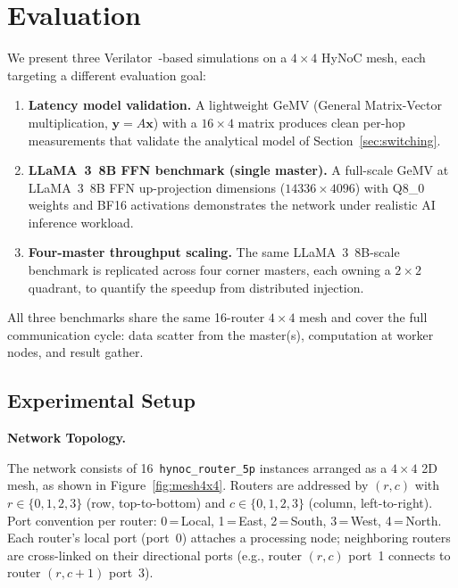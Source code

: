 \section{Evaluation}
\label{sec:evaluation}

We present three Verilator~\cite{verilator}-based simulations on a $4\times4$
HyNoC mesh, each targeting a different evaluation goal:
\begin{enumerate}
  \item \textbf{Latency model validation.}  A lightweight GeMV
        (General Matrix-Vector multiplication, $\mathbf{y}=A\mathbf{x}$) with a
        $16\times4$ matrix produces clean per-hop measurements that validate
        the analytical model of Section~\ref{sec:switching}.
  \item \textbf{LLaMA~3~8B FFN benchmark (single master).}  A full-scale
        GeMV at LLaMA~3~8B FFN up-projection dimensions
        ($14336\times4096$) with Q8\_0 weights and BF16 activations
        demonstrates the network under realistic AI inference workload.
  \item \textbf{Four-master throughput scaling.}  The same LLaMA~3~8B-scale
        benchmark is replicated across four corner masters, each owning a
        $2\times2$ quadrant, to quantify the speedup from distributed
        injection.
\end{enumerate}
All three benchmarks share the same 16-router $4\times4$ mesh and cover the
full communication cycle: data scatter from the master(s), computation at
worker nodes, and result gather.

\subsection{Experimental Setup}

\textbf{Network Topology.}

The network consists of 16~\texttt{hynoc\_router\_5p} instances arranged as
a $4\times4$ 2D mesh, as shown in Figure~\ref{fig:mesh4x4}.  Routers are
addressed by $(r,c)$ with $r\in\{0,1,2,3\}$ (row, top-to-bottom) and
$c\in\{0,1,2,3\}$ (column, left-to-right).  Port convention per router:
0\,=\,Local, 1\,=\,East, 2\,=\,South, 3\,=\,West, 4\,=\,North.  Each
router's local port (port~0) attaches a processing node; neighboring routers are
cross-linked on their directional ports (e.g., router $(r,c)$ port~1 connects to
router $(r,c{+}1)$ port~3).

